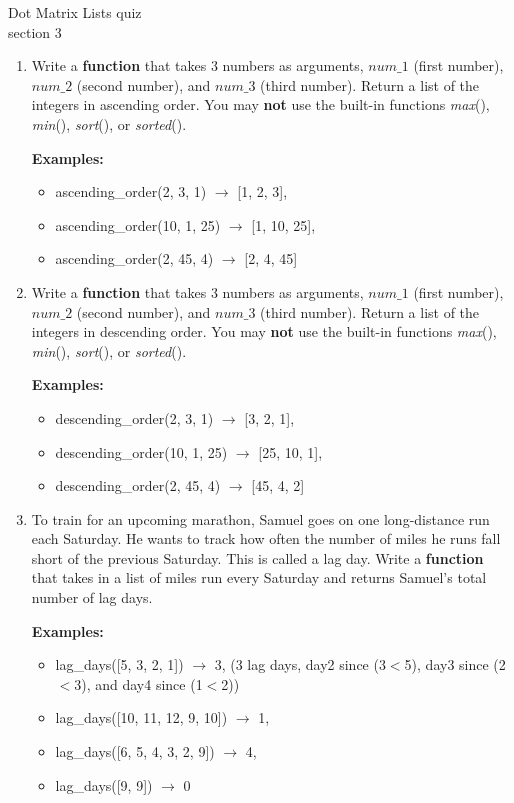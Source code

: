 \documentclass{article}
\begin{document}
\pagebreak
Dot Matrix \hfill Lists quiz\\
section 3\\
\begin{enumerate}
	\item
		Write a \textbf{function} that takes 3 numbers as arguments, $num\_1$ (first number), 
		$num\_2$ (second number), and $num\_3$ (third number). 
		Return a list of the integers in ascending order. 
		You may \textbf{not} use the built-in functions \textit{max}(), \textit{min}(), 
		\textit{sort}(), or \textit{sorted}().
		
	\textbf{Examples:}
	\begin{itemize}
		\item  ascending\_order(2, 3, 1) $\rightarrow$ [1, 2, 3], 
		\item  ascending\_order(10, 1, 25) $\rightarrow$ [1, 10, 25], 
		\item  ascending\_order(2, 45, 4) $\rightarrow$ [2, 4, 45] 
	\end{itemize}


	\item
		Write a \textbf{function} that takes 3 numbers as arguments, $num\_1$ (first number), 
		$num\_2$ (second number), and $num\_3$ (third number). 
		Return a list of the integers in descending order. 
		You may \textbf{not} use the built-in functions \textit{max}(), \textit{min}(), 
		\textit{sort}(), or \textit{sorted}().
		
	\textbf{Examples:}
	\begin{itemize}
		\item  descending\_order(2, 3, 1) $\rightarrow$ [3, 2, 1], 
		\item  descending\_order(10, 1, 25) $\rightarrow$ [25, 10, 1], 
		\item  descending\_order(2, 45, 4) $\rightarrow$ [45, 4, 2] 
	\end{itemize}



	\item
		To train for an upcoming marathon, Samuel goes on one long-distance run each Saturday. 
		He wants to track how often the number of miles he runs fall short of the previous Saturday. 
		This is called a lag day. Write a \textbf{function} that takes in a list of miles 
		run every Saturday and returns Samuel's total number of lag days.

		\textbf{Examples:}		
		\begin{itemize}
			\item  lag\_days([5, 3, 2, 1]) $\rightarrow$ 3, 
				(3 lag days, day2 since (3$<$5), day3 since (2$<$3), and day4 since (1$<$2))
			\item  lag\_days([10, 11, 12, 9, 10]) $\rightarrow$ 1, 
			\item  lag\_days([6, 5, 4, 3, 2, 9]) $\rightarrow$ 4, 
			\item  lag\_days([9, 9]) $\rightarrow$ 0
		\end{itemize}

\end{enumerate}
\end{document}
